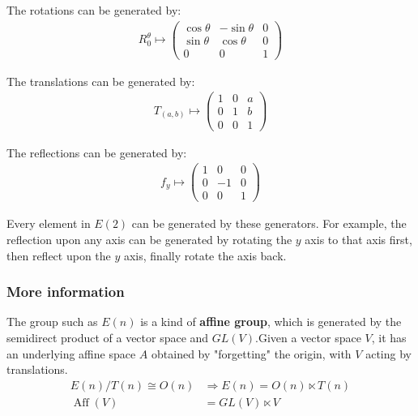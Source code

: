 \documentclass[]{ctexart}
\begin{document}
		The rotations can be generated by:
			\begin{equation*}
			\begin{aligned}
				R^{\theta}_0\mapsto
				\begin{pmatrix}
				\cos \theta & -\sin \theta & 0\\
				\sin \theta & \cos \theta & 0\\
				0 & 0 & 1
				\end{pmatrix}
			\end{aligned}
			\end{equation*}
			
		The translations can be generated by:
			\begin{equation*}
			\begin{aligned}
				T_{(a,b)}\mapsto
				\begin{pmatrix}
				1 & 0 & a\\
				0 & 1 & b\\
				0 & 0 & 1
				\end{pmatrix}
			\end{aligned}
			\end{equation*}
			
		The reflections can be generated by:
			\begin{equation*}
			\begin{aligned}
				f_y\mapsto
				\begin{pmatrix}
				1 & 0 & 0\\
				0 & -1 & 0\\
				0 & 0 & 1
				\end{pmatrix}
			\end{aligned}
			\end{equation*}
		
		Every element in $E(2)$ can be generated by these generators. For example, the reflection upon any axis can be generated by rotating the $y$ axis to that axis first, then reflect upon the $y$ axis, finally rotate the axis back. 
		
			\subsubsection{More information}
				The group such as $E(n)$ is a kind of \textbf{affine group}, which is generated by the semidirect product of a vector space and $ GL(V) $.Given a vector space $ V $, it has an underlying affine space $ A $ obtained by "forgetting" the origin, with $ V $ acting by translations.
					\begin{equation*}
					\begin{aligned}
						E(n)/T(n)\cong O(n)&\Rightarrow E(n)=O(n)\ltimes T(n)\\
						\operatorname{Aff}(V)&=GL(V)\ltimes V
					\end{aligned}
					\end{equation*}
					
\end{document}
